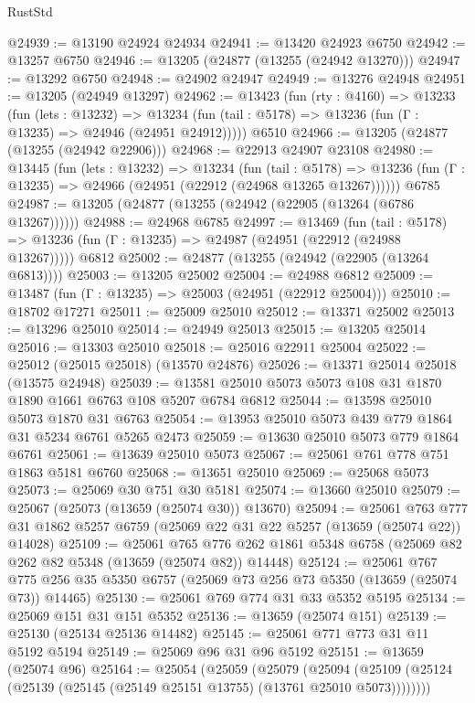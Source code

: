 \begin{lexlean}{RustStd}
\begin{coremodule}
@24939 := @13190 @24924 @24934
@24941 := @13420 @24923 @6750
@24942 := @13257 @6750
@24946 := @13205 (@24877 (@13255 (@24942 @13270)))
@24947 := @13292 @6750
@24948 := @24902 @24947
@24949 := @13276 @24948
@24951 := @13205 (@24949 @13297)
@24962 := @13423
    (fun (rty : @4160) =>
    @13233
      (fun (lets : @13232) =>
      @13234 (fun (tail : @5178) => @13236 (fun (Γ : @13235) => @24946 (@24951 @24912)))))
    @6510
@24966 := @13205 (@24877 (@13255 (@24942 @22906)))
@24968 := @22913 @24907 @23108
@24980 := @13445
    (fun (lets : @13232) =>
    @13234
      (fun (tail : @5178) =>
      @13236 (fun (Γ : @13235) => @24966 (@24951 (@22912 (@24968 @13265 @13267))))))
    @6785
@24987 := @13205 (@24877 (@13255 (@24942 (@22905 (@13264 (@6786 @13267))))))
@24988 := @24968 @6785
@24997 := @13469
    (fun (tail : @5178) => @13236 (fun (Γ : @13235) => @24987 (@24951 (@22912 (@24988 @13267)))))
    @6812
@25002 := @24877 (@13255 (@24942 (@22905 (@13264 @6813))))
@25003 := @13205 @25002
@25004 := @24988 @6812
@25009 := @13487 (fun (Γ : @13235) => @25003 (@24951 (@22912 @25004)))
@25010 := @18702 @17271
@25011 := @25009 @25010
@25012 := @13371 @25002
@25013 := @13296 @25010
@25014 := @24949 @25013
@25015 := @13205 @25014
@25016 := @13303 @25010
@25018 := @25016 @22911 @25004
@25022 := @25012 (@25015 @25018) (@13570 @24876)
@25026 := @13371 @25014 @25018 (@13575 @24948)
@25039 := @13581 @25010 @5073 @5073 @108 @31 @1870 @1890 @1661 @6763 @108 @5207 @6784 @6812
@25044 := @13598 @25010 @5073 @1870 @31 @6763
@25054 := @13953 @25010 @5073 @439 @779 @1864 @31 @5234 @6761 @5265 @2473
@25059 := @13630 @25010 @5073 @779 @1864 @6761
@25061 := @13639 @25010 @5073
@25067 := @25061 @761 @778 @751 @1863 @5181 @6760
@25068 := @13651 @25010
@25069 := @25068 @5073
@25073 := @25069 @30 @751 @30 @5181
@25074 := @13660 @25010
@25079 := @25067 (@25073 (@13659 (@25074 @30)) @13670)
@25094 := @25061
    @763
    @777
    @31
    @1862
    @5257
    @6759
    (@25069 @22 @31 @22 @5257 (@13659 (@25074 @22)) @14028)
@25109 := @25061
    @765
    @776
    @262
    @1861
    @5348
    @6758
    (@25069 @82 @262 @82 @5348 (@13659 (@25074 @82)) @14448)
@25124 := @25061
    @767
    @775
    @256
    @35
    @5350
    @6757
    (@25069 @73 @256 @73 @5350 (@13659 (@25074 @73)) @14465)
@25130 := @25061 @769 @774 @31 @33 @5352 @5195
@25134 := @25069 @151 @31 @151 @5352
@25136 := @13659 (@25074 @151)
@25139 := @25130 (@25134 @25136 @14482)
@25145 := @25061 @771 @773 @31 @11 @5192 @5194
@25149 := @25069 @96 @31 @96 @5192
@25151 := @13659 (@25074 @96)
@25164 := @25054
    (@25059
      (@25079
        (@25094 (@25109 (@25124 (@25139 (@25145 (@25149 @25151 @13755) (@13761 @25010 @5073))))))))

\end{coremodule}
\end{lexlean}
